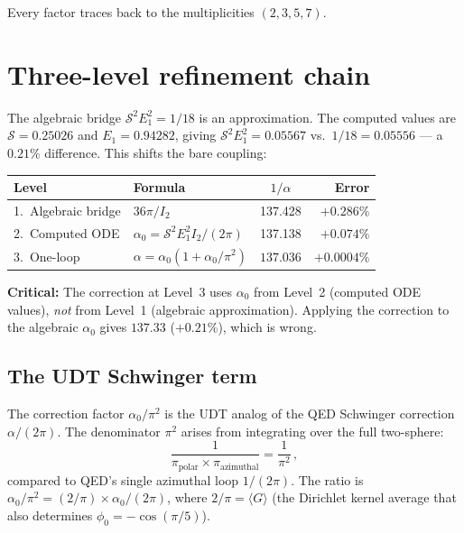 \documentclass[11pt,letterpaper]{article}
\numberwithin{equation}{section}
\begin{document}
Every factor traces back to the multiplicities $(2, 3, 5, 7)$.

\section{Three-level refinement chain}
\label{sec:three-level}

The algebraic bridge $\mathcal{S}^2 E_1^2 = 1/18$ is an approximation.
The computed values are $\mathcal{S} = 0.25026$ and $E_1 = 0.94282$,
giving $\mathcal{S}^2 E_1^2 = 0.05567$ vs.\ $1/18 = 0.05556$ --- a
$0.21\%$ difference.  This shifts the bare coupling:

\begin{center}
\begin{tabular}{llcr}
\toprule
Level & Formula & $1/\alpha$ & Error \\
\midrule
1.~Algebraic bridge & $36\pi/I_2$ & 137.428 & $+0.286\%$ \\
2.~Computed ODE & $\alpha_0 = \mathcal{S}^2 E_1^2 I_2/(2\pi)$
  & 137.138 & $+0.074\%$ \\
3.~One-loop & $\alpha = \alpha_0(1 + \alpha_0/\pi^2)$
  & $\mathbf{137.036}$ & $\mathbf{+0.0004\%}$ \\
\bottomrule
\end{tabular}
\end{center}

\textbf{Critical:} The correction at Level~3 uses $\alpha_0$ from
Level~2 (computed ODE values), \emph{not} from Level~1 (algebraic
approximation).  Applying the correction to the algebraic $\alpha_0$
gives $137.33$ ($+0.21\%$), which is wrong.

\subsection{The UDT Schwinger term}

The correction factor $\alpha_0/\pi^2$ is the UDT analog of the QED
Schwinger correction $\alpha/(2\pi)$.  The denominator $\pi^2$ arises
from integrating over the full two-sphere:
\begin{equation}
  \frac{1}{\pi_{\text{polar}} \times \pi_{\text{azimuthal}}}
  = \frac{1}{\pi^2}\,,
\end{equation}
compared to QED's single azimuthal loop $1/(2\pi)$.  The ratio is
$\alpha_0/\pi^2 = (2/\pi) \times \alpha_0/(2\pi)$, where
$2/\pi = \langle G \rangle$ (the Dirichlet kernel average that also
determines $\phi_0 = -\cos(\pi/5)$).
\end{document}

